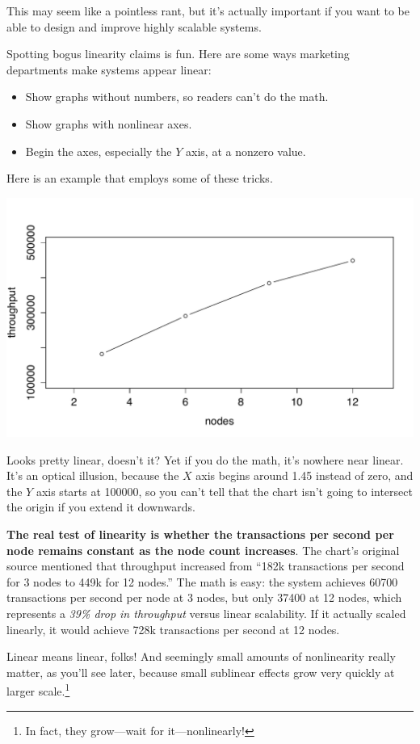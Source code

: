 \documentclass{vivid_layout}
\begin{document}
This may seem like a pointless rant, but it's actually important if you want to
be able to design and improve highly scalable systems.

Spotting bogus linearity claims is fun. Here are some ways
marketing departments make systems appear linear:

\begin{itemize}
\item Show graphs without numbers, so readers can't do the math.
\item Show graphs with nonlinear axes.
\item Begin the axes, especially the $Y$ axis, at a nonzero value.
\end{itemize}

Here is an example that employs some of these tricks.
\begin{center}
\includegraphics[width=.85\linewidth]{scalability/voltdb1}
\end{center}
Looks pretty linear, doesn't it? Yet if you do the math, it's nowhere near
linear.  It's an optical illusion, because the $X$ axis begins around
1.45 instead of zero, and the $Y$ axis starts at 100000, so you can't tell that
the chart isn't going to intersect the origin if you extend it downwards.

{\bfseries The real test of linearity is whether the transactions per second per
node remains constant as the node count increases}. The chart's original source
mentioned that throughput increased from ``182k transactions per second for 3
nodes to 449k for 12 nodes.'' The math is easy: the system achieves 60700
transactions per second per node at 3 nodes, but only 37400 at 12 nodes, which
represents a {\itshape 39\% drop in throughput} versus linear scalability.  If
it actually scaled linearly, it would achieve 728k transactions per second at 12
nodes.

Linear means linear, folks! And seemingly small amounts of nonlinearity really
matter, as you'll see later, because small sublinear effects grow very quickly
at larger scale.\footnote{In fact, they grow---wait for it---nonlinearly!}
\end{document}
